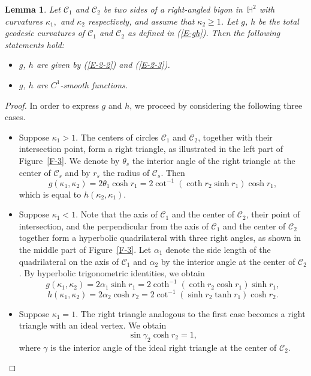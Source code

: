 \documentclass[11pt,leqno]{article}
\numberwithin{equation}{section}
\newtheorem{lemma}[theorem]{Lemma}
\theoremstyle{definition}
\begin{document}
\begin{lemma}\label{L-3-3}
 Let $\mathcal C_1$ and $\mathcal C_2$ be two sides of a right-angled bigon in~$\mathbb H^2$ with curvatures $\kappa_1,$ and $\kappa_2$ respectively, and assume that $\kappa_2\geq 1$. Let $g$, $h$ be the total geodesic curvatures of $\mathcal C_1$ and $\mathcal C_2$ as defined in (\ref{E-gh}).
 Then the following statements hold:
\begin{itemize}
\item[($i$)] $g$, $h$ are given by (\ref{E-2-2}) and (\ref{E-2-3}).
\item[($ii$)]  $g$, $h$ are $C^1$-smooth functions.
\end{itemize}
\end{lemma}
\begin{proof}
In order to express $g$ and $h$, we proceed by considering the following three cases.
\begin{itemize}
\item[($a$)] Suppose $\kappa_1>1$. The centers of circles $\mathcal C_1$ and $\mathcal C_2$, together with their intersection point, form a right triangle, as illustrated in the left part of Figure~\ref{F-3}. We denote by $\theta_ s$  the interior angle of the right triangle at the center of $\mathcal C_s$ and by $r_s$ the radius of $\mathcal C_s$. Then
    \[g(\kappa_1,\kappa_2)=2\theta_1\cosh r_1=2\cot^{-1}(\coth r_2\sinh r_1)\cosh r_1,\]
which is equal to $h(\kappa_2,\kappa_1)$.
\item[($b$)] Suppose $\kappa_1<1$. Note that the axis of \(\mathcal C_1\) and the center of \(\mathcal C_2\), their point of intersection, and the perpendicular from the axis of \(\mathcal C_1\) and the center of \(\mathcal C_2\) together form a hyperbolic quadrilateral with three right angles, as shown in the middle part of Figure~\ref{F-3}. Let $\alpha_1$ denote the side length of the quadrilateral on the axis of $\mathcal C_1$ and $\alpha_2$ by the interior angle at the center of $\mathcal C_2$. By hyperbolic trigonometric identities, we obtain
    \[g(\kappa_1,\kappa_2)=2\alpha_1\sinh r_1=2\coth^{-1}(\coth r_2\cosh r_1)\sinh r_1,\]
    \[h(\kappa_1,\kappa_2)=2\alpha_2\cosh r_2=2\cot^{-1}(\sinh r_2\tanh r_1)\cosh r_2.\]
\item[($c$)] Suppose $\kappa_1=1$. The right triangle analogous to the first case becomes a right triangle with an ideal vertex. We obtain
    \begin{equation}\label{E-2-4}\sin\gamma_2\cosh r_2=1,\end{equation}
where $\gamma$ is the interior angle of the ideal right triangle at the center of $\mathcal C_2$.

\end{itemize}
\end{proof}
\end{document}
